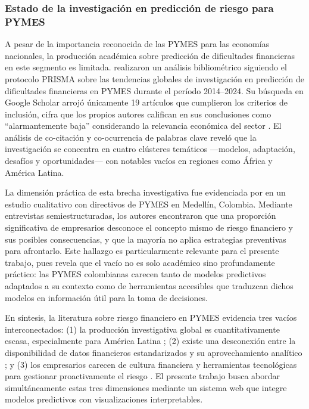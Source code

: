 \documentclass[12pt, letterpaper]{article}
\begin{document}
\subsubsection{Estado de la investigaci\'on en predicci\'on de riesgo para PYMES}

A pesar de la importancia reconocida de las PYMES para las econom\'ias nacionales, la producci\'on acad\'emica sobre predicci\'on de dificultades financieras en este segmento es limitada. \citet{Abubakar2025} realizaron un an\'alisis bibliom\'etrico siguiendo el protocolo PRISMA sobre las tendencias globales de investigaci\'on en predicci\'on de dificultades financieras en PYMES durante el per\'iodo 2014--2024. Su b\'usqueda en Google Scholar arroj\'o \'unicamente 19 art\'iculos que cumplieron los criterios de inclusi\'on, cifra que los propios autores califican en sus conclusiones como ``alarmantemente baja'' considerando la relevancia econ\'omica del sector \citep[juicio atribuido a los autores originales;][]{Abubakar2025}. El an\'alisis de co-citaci\'on y co-ocurrencia de palabras clave revel\'o que la investigaci\'on se concentra en cuatro cl\'usteres tem\'aticos ---modelos, adaptaci\'on, desaf\'ios y oportunidades--- con notables vac\'ios en regiones como \'Africa y Am\'erica Latina.

La dimensi\'on pr\'actica de esta brecha investigativa fue evidenciada por \citet{CardonaZuleta2025} en un estudio cualitativo con directivos de PYMES en Medell\'in, Colombia. Mediante entrevistas semiestructuradas, los autores encontraron que una proporci\'on significativa de empresarios desconoce el concepto mismo de riesgo financiero y sus posibles consecuencias, y que la mayor\'ia no aplica estrategias preventivas para afrontarlo. Este hallazgo es particularmente relevante para el presente trabajo, pues revela que el vac\'io no es solo acad\'emico sino profundamente pr\'actico: las PYMES colombianas carecen tanto de modelos predictivos adaptados a su contexto como de herramientas accesibles que traduzcan dichos modelos en informaci\'on \'util para la toma de decisiones.

En s\'intesis, la literatura sobre riesgo financiero en PYMES evidencia tres vac\'ios interconectados: (1) la producci\'on investigativa global es cuantitativamente escasa, especialmente para Am\'erica Latina \citep{Abubakar2025}; (2) existe una desconexi\'on entre la disponibilidad de datos financieros estandarizados y su aprovechamiento anal\'itico \citep{HigueraVargas2021}; y (3) los empresarios carecen de cultura financiera y herramientas tecnol\'ogicas para gestionar proactivamente el riesgo \citep{CardonaZuleta2025, Senaya2025}. El presente trabajo busca abordar simult\'aneamente estas tres dimensiones mediante un sistema web que integre modelos predictivos con visualizaciones interpretables.
\end{document}
